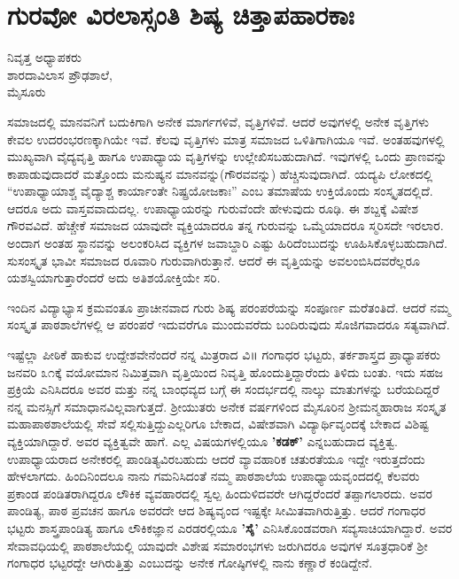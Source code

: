 {\fontsize{14}{16}\selectfont
\chapter{ಗುರವೋ ವಿರಲಾಸ್ಸಂತಿ ಶಿಷ್ಯ ಚಿತ್ತಾಪಹಾರಕಾಃ}

\begin{center}
\smallskip

ನಿವೃತ್ತ ಅಧ್ಯಾಪಕರು\\
ಶಾರದಾವಿಲಾಸ ಪ್ರೌಢಶಾಲೆ,\\ 
ಮೈಸೂರು
\addrule
\end{center}

ಸಮಾಜದಲ್ಲಿ ಮಾನವನಿಗೆ ಬದುಕಿಗಾಗಿ ಅನೇಕ ಮಾರ್ಗಗಳಿವೆ, ವೃತ್ತಿಗಳಿವೆ. ಆದರೆ ಅವುಗಳಲ್ಲಿ ಅನೇಕ ವೃತ್ತಿಗಳು ಕೇವಲ ಉದರಂಭರಣಕ್ಕಾಗಿಯೇ ಇವೆ. ಕೆಲವು ವೃತ್ತಿಗಳು ಮಾತ್ರ ಸಮಾಜದ ಒಳಿತಿಗಾಗಿಯೂ ಇವೆ. ಅಂತಹವುಗಳಲ್ಲಿ ಮುಖ್ಯವಾಗಿ ವೈದ್ಯವೃತ್ತಿ ಹಾಗೂ ಉಪಾಧ್ಯಾಯ ವೃತ್ತಿಗಳನ್ನು ಉಲ್ಲೇಖಿಸಬಹುದಾಗಿದೆ. ಇವುಗಳಲ್ಲಿ ಒಂದು ಪ್ರಾಣವನ್ನು ಕಾಪಾಡುವುದಾದರೆ ಮತ್ತೊಂದು ಮನುಷ್ಯನ ಮಾನವನ್ನು(ಗೌರವವನ್ನು) ಹೆಚ್ಚಿಸುವುದಾಗಿದೆ. ಯದ್ಯಪಿ ಲೋಕದಲ್ಲಿ “ಉಪಾಧ್ಯಾಯಾಶ್ಚ ವೈದ್ಯಾಶ್ಚ ಕಾರ್ಯಾಂತೇ ನಿಷ್ಪ್ರಯೋಜಕಾಃ” ಎಂಬ ತಮಾಷೆಯ ಉಕ್ತಿಯೊಂದು ಸಂಸ್ಕೃತದಲ್ಲಿದೆ. ಆದರೂ ಅದು ವಾಸ್ತವವಾದುದಲ್ಲ. ಉಪಾಧ್ಯಾಯರನ್ನು ಗುರುವೆಂದೇ ಹೇಳುವುದು ರೂಢಿ. ಈ ಶಬ್ದಕ್ಕೆ ವಿಷೇಶ ಗೌರವವಿದೆ. ಹೆಚ್ಚೇಕೆ ಸಮಾಜದ ಯಾವುದೇ ವ್ಯಕ್ತಿಯಾದರೂ ತನ್ನ ಗುರುವನ್ನು ಒಮ್ಮೆಯಾದರೂ ಸ್ಮರಿಸದೇ ಇರಲಾರ. ಅಂದಾಗ ಅಂತಹ ಸ್ಥಾನವನ್ನು ಅಲಂಕರಿಸಿದ ವ್ಯಕ್ತಿಗಳ ಜವಾಬ್ದಾರಿ ಎಷ್ಟು ಹಿರಿದೆಂಬುದನ್ನು ಊಹಿಸಿಕೊಳ್ಳಬಹುದಾಗಿದೆ. ಸುಸಂಸ್ಕೃತ ಭಾವೀ ಸಮಾಜದ ರೂವಾರಿ ಗುರುವಾಗಿರುತ್ತಾನೆ. ಆದರೆ ಈ ವೃತ್ತಿಯನ್ನು ಅವಲಂಬಿಸಿದವರೆಲ್ಲರೂ ಯಶಸ್ವಿಯಾಗುತ್ತಾರೆಂದರೆ ಅದು ಅತಿಶಯೋಕ್ತಿಯೇ ಸರಿ.

ಇಂದಿನ ವಿದ್ಯಾಭ್ಯಾಸ ಕ್ರಮವಂತೂ ಪ್ರಾಚೀನವಾದ ಗುರು ಶಿಷ್ಯ ಪರಂಪರೆಯನ್ನು ಸಂಪೂರ್ಣ ಮರೆತಂತಿದೆ. ಆದರೆ ನಮ್ಮ ಸಂಸ್ಕೃತ ಪಾಠಶಾಲೆಗಳಲ್ಲಿ ಆ ಪರಂಪರೆ ಇದುವರೆಗೂ ಮುಂದುವರೆದು ಬಂದಿರುವುದು ಸೊಜಿಗವಾದರೂ ಸತ್ಯವಾಗಿದೆ.

ಇಷ್ಟೆಲ್ಲಾ ಪೀಠಿಕೆ ಹಾಕುವ ಉದ್ದೇಶವೇನೆಂದರೆ ನನ್ನ ಮಿತ್ರರಾದ ವಿ॥ ಗಂಗಾಧರ ಭಟ್ಟರು, ತರ್ಕಶಾಸ್ತ್ರದ ಪ್ರಾಧ್ಯಾಪಕರು ಜನವರಿ ೩೧ಕ್ಕೆ ವಯೋಮಾನ ನಿಮಿತ್ತವಾಗಿ ವೃತ್ತಿಯಿಂದ ನಿವೃತ್ತಿ ಹೊಂದುತ್ತಿದ್ದಾರೆಂದು ತಿಳಿದು ಬಂತು. ಇದು ಸಹಜ ಪ್ರಕ್ರಿಯೆ ಎನಿಸಿದರೂ ಅವರ ಮತ್ತು ನನ್ನ ಬಾಂಧವ್ಯದ ಬಗ್ಗೆ ಈ ಸಂದರ್ಭದಲ್ಲಿ ನಾಲ್ಕು ಮಾತುಗಳನ್ನು ಬರೆಯದಿದ್ದರೆ ನನ್ನ ಮನಸ್ಸಿಗೆ ಸಮಾಧಾನವಿಲ್ಲವಾಗುತ್ತದೆ. ಶ್ರೀಯುತರು ಅನೇಕ ವರ್ಷಗಳಿಂದ ಮೈಸೂರಿನ ಶ್ರೀಮನ್ಮಹಾರಾಜ ಸಂಸ್ಕೃತ ಮಹಾಪಾಠಶಾಲೆಯಲ್ಲಿ ಸೇವೆ ಸಲ್ಲಿಸುತ್ತಿದ್ದುಎಲ್ಲರಿಗೂ ಬೇಕಾದ, ವಿಷೇಶವಾಗಿ ವಿದ್ಯಾರ್ಥಿವೃಂದಕ್ಕೆ ಬೇಕಾದ ವಿಶಿಷ್ಟ ವ್ಯಕ್ತಿಯಾಗಿದ್ದಾರೆ. ಅವರ ವ್ಯಕ್ತಿತ್ವವೇ ಹಾಗೆ. ಎಲ್ಲ ವಿಷಯಗಳಲ್ಲಿಯೂ \textbf{’ಕಡಕ್’} ಎನ್ನಬಹುದಾದ ವ್ಯಕ್ತಿತ್ವ. ಉಪಾಧ್ಯಾಯರಾದ ಅನೇಕರಲ್ಲಿ ಪಾಂಡಿತ್ಯವಿರಬಹುದು ಆದರೆ ವ್ಯಾವಹಾರಿಕ ಚತುರತೆಯೂ ಇದ್ದೇ ಇರುತ್ತದೆಂದು ಹೇಳಲಾಗದು. ಹಿಂದಿನಿಂದಲೂ ನಾನು ಗಮನಿಸಿದಂತೆ ನಮ್ಮ ಪಾಠಶಾಲೆಯ ಉಪಾಧ್ಯಾಯವೃಂದದಲ್ಲಿ ಕೆಲವರು ಪ್ರಕಾಂಡ ಪಂಡಿತರಾಗಿದ್ದರೂ ಲೌಕಿಕ ವ್ಯವಹಾರದಲ್ಲಿ ಸ್ವಲ್ಪ ಹಿಂದುಳಿದವರೇ ಆಗಿದ್ದರೆಂದರೆ ತಪ್ಪಾಗಲಾರದು. ಅವರ ಪಾಂಡಿತ್ಯ, ಪಾಠ ಪ್ರವಚನ ಹಾಗೂ ಅವರದೇ ಆದ ಶಿಷ್ಯವೃಂದ ಇಷ್ಟಕ್ಕೇ ಸೀಮಿತವಾಗಿರುತ್ತಿತ್ತು. ಆದರೆ ಗಂಗಾಧರ ಭಟ್ಟರು ಶಾಸ್ತ್ರಪಾಂಡಿತ್ಯ ಹಾಗೂ ಲೌಕಿಕಜ್ಞಾನ ಎರಡರಲ್ಲಿಯೂ \textbf{’ಸೈ’} ಎನಿಸಿಕೊಂಡವರಾಗಿ ಸವ್ಯಸಾಚಿಯಾಗಿದ್ದಾರೆ. ಅವರ ಸೇವಾವಧಿಯಲ್ಲಿ ಪಾಠಶಾಲೆಯಲ್ಲಿ ಯಾವುದೇ ವಿಶೇಷ ಸಮಾರಂಭಗಳು ಜರುಗಿದರೂ ಅವುಗಳ ಸೂತ್ರಧಾರಿಕೆ ಶ್ರೀ ಗಂಗಾಧರ ಭಟ್ಟರದ್ದೇ ಆಗಿರುತ್ತಿತ್ತು ಎಂಬುದನ್ನು ಅನೇಕ ಗೋಷ್ಠಿಗಳಲ್ಲಿ ನಾನು ಕಣ್ಣಾರೆ ಕಂಡಿದ್ದೇನೆ.

}
